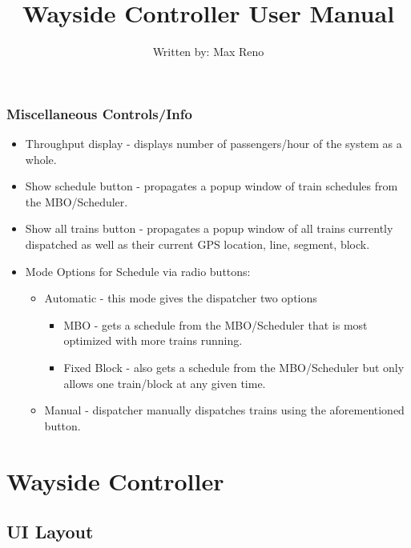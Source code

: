 \documentclass[letterpaper]{article}
\begin{document}
\subsubsection{Miscellaneous Controls/Info}
\begin{itemize}
	\item Throughput display - displays number of passengers/hour of the system as a whole.
	\item Show schedule button - propagates a popup window of train schedules from the MBO/Scheduler.
	\item Show all trains button - propagates a popup window of all trains currently dispatched as well as their current GPS location, line, segment, block.
	\item Mode Options for Schedule via radio buttons:
	\begin{itemize}
		\item Automatic - this mode gives the dispatcher two options
		\begin{itemize}
			\item MBO - gets a schedule from the MBO/Scheduler that is most optimized with more trains running.
			\item Fixed Block - also gets a schedule from the MBO/Scheduler but only allows one train/block at any given time.
		\end{itemize}
		\item Manual - dispatcher manually dispatches trains using the aforementioned button.
	\end{itemize}
\end{itemize}

\newpage

\begin{center}
\Large
\title{Wayside Controller User Manual \\}
\author{Written by: Max Reno}
\date{}	
\end{center}


\maketitle

\section{Wayside Controller}

\subsection{UI Layout}
\end{document}
